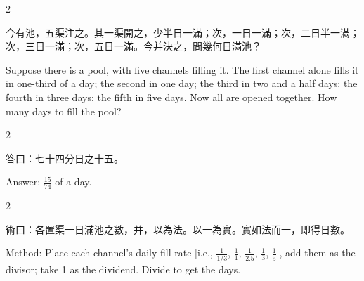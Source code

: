 \documentclass[10pt,a4paper]{article}
\begin{document}
\begin{paracol}{2}

\begin{leftcolumn*}
\begin{problembi}
今有池，五渠注之。其一渠開之，少半日一滿；次，一日一滿；次，二日半一滿；次，三日一滿；次，五日一滿。今并決之，問幾何日滿池？
\end{problembi}
\end{leftcolumn*}

\begin{rightcolumn*}
\begin{problembi}
Suppose there is a pool, with five channels filling it. The first channel alone fills it in one-third of a day; the second in one day; the third in two and a half days; the fourth in three days; the fifth in five days. Now all are opened together. How many days to fill the pool?
\end{problembi}
\end{rightcolumn*}

\end{paracol}

\begin{paracol}{2}

\begin{leftcolumn*}
\begin{answerbi}[\textbf{答}]
答曰：七十四分日之十五。
\end{answerbi}
\end{leftcolumn*}

\begin{rightcolumn*}
\begin{answerbi}
Answer: $\frac{15}{74}$ of a day.
\end{answerbi}
\end{rightcolumn*}

\end{paracol}

\begin{paracol}{2}

\begin{leftcolumn*}
\begin{methodbi}[\textbf{術}]
術曰：各置渠一日滿池之數，并，以為法。以一為實。實如法而一，即得日數。
\end{methodbi}
\end{leftcolumn*}

\begin{rightcolumn*}
\begin{methodbi}
Method: Place each channel's daily fill rate [i.e., $\frac{1}{1/3}$, $\frac{1}{1}$, $\frac{1}{2.5}$, $\frac{1}{3}$, $\frac{1}{5}$], add them as the divisor; take 1 as the dividend. Divide to get the days.
\end{methodbi}
\end{rightcolumn*}

\end{paracol}
\end{document}
